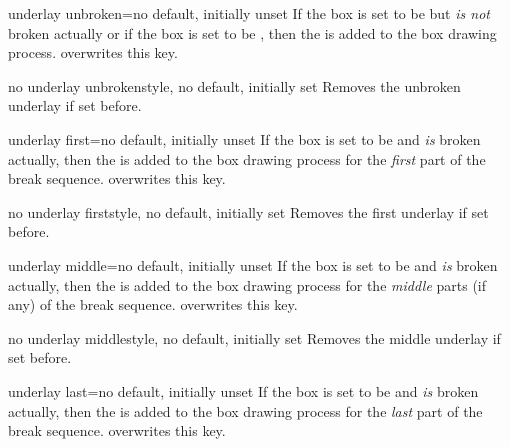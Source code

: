 \begin{docTcbKey}{underlay unbroken}{=}{no default, initially unset}
  If the box is set to be  but \emph{is not} broken actually
  or if the box is set to be ,
  then the  is added to the box drawing process.
   overwrites this key.
\end{docTcbKey}

\begin{docTcbKey}{no underlay unbroken}{}{style, no default, initially set}
  Removes the unbroken underlay if set before.
\end{docTcbKey}

\begin{docTcbKey}{underlay first}{=}{no default, initially unset}
  If the box is set to be  and \emph{is} broken actually,
  then the  is added to the box drawing process for
  the \emph{first} part of the break sequence.
   overwrites this key.
\end{docTcbKey}

\begin{docTcbKey}{no underlay first}{}{style, no default, initially set}
  Removes the first underlay if set before.
\end{docTcbKey}

\begin{docTcbKey}{underlay middle}{=}{no default, initially unset}
  If the box is set to be  and \emph{is} broken actually,
  then the  is added to the box drawing process for
  the \emph{middle} parts (if any) of the break sequence.
   overwrites this key.
\end{docTcbKey}

\begin{docTcbKey}{no underlay middle}{}{style, no default, initially set}
  Removes the middle underlay if set before.
\end{docTcbKey}

\begin{docTcbKey}{underlay last}{=}{no default, initially unset}
  If the box is set to be  and \emph{is} broken actually,
  then the  is added to the box drawing process for
  the \emph{last} part of the break sequence.
   overwrites this key.
\end{docTcbKey}

